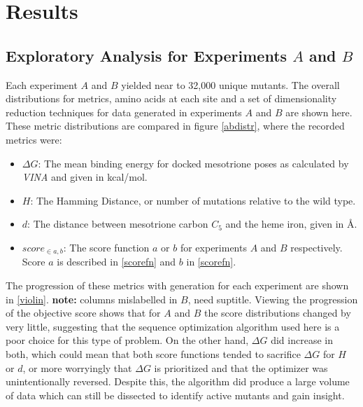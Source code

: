\documentclass[16pt]{book}
\begin{document}
\section{Results}


\subsection{Exploratory Analysis for Experiments $A$ and $B$}
Each experiment $A$ and $B$ yielded near to 32,000 unique mutants.
The overall distributions for metrics, amino acids at each site and a set of dimensionality reduction techniques for data generated in experiments $A$ and $B$ are shown here.
These metric distributions are compared in figure \ref{abdistr}, where the recorded metrics were:
\begin{itemize}
	\item $\Delta G$: The mean binding energy for docked mesotrione poses as calculated by \textit{VINA} and given in kcal/mol.
	\item $H$: The Hamming Distance, or number of mutations relative to the wild type.
	\item $d$: The distance between mesotrione carbon $C_5$ and the heme iron, given in \AA.
	\item $score_{\in {a, b}}$: The score function $a$ or $b$ for experiments $A$ and $B$ respectively. Score $a$ is described in \ref{scorefn} and $b$ in \ref{scorefn}.
\end{itemize}

The progression of these metrics with generation for each experiment are shown in \ref{violin}.
\textbf{note:} columns mislabelled in $B$, need suptitle.
Viewing the progression of the objective score shows that for $A$ and $B$ the score distributions changed by very little, suggesting that the sequence optimization algorithm used here is a poor choice for this type of problem.
On the other hand, $\Delta G$ did increase in both, which could mean that both score functions tended to sacrifice $\Delta G$ for $H$ or $d$, or more worryingly that $\Delta G$ is prioritized and that the optimizer was unintentionally reversed.
Despite this, the algorithm did produce a large volume of data which can still be dissected to identify active mutants and gain insight. 
\end{document}
